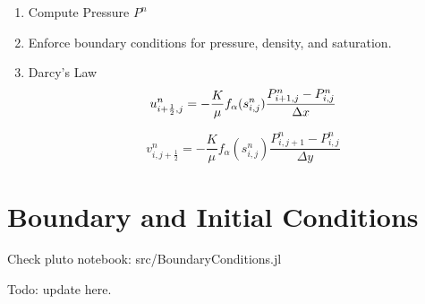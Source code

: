 \documentclass[a4paper,12pt]{article}
\begin{document}
\begin{enumerate}
\begin{enumerate}
            \item Compute Pressure \(P^n\)
            \item Enforce boundary conditions for pressure,
                density, and saturation.
            \item Darcy's Law
\[
    u_{i + \frac{1}{2}, j}^n = -\frac{K}{\mu} f_\alpha (s_{i, j}^n)
    \frac{P_{i + 1, j}^n - P_{i, j}^n}{\Delta x} \\
\] 

\[
    v_{i, j + \frac{1}{2}}^n = -\frac{K}{\mu} f_\alpha(s_{i, j}^n)
    \frac{P_{i, j + 1}^n - P_{i, j}^n}{\Delta y}
\] 
        \end{enumerate}
\end{enumerate}

\section{Boundary and Initial Conditions}
Check pluto notebook: src/BoundaryConditions.jl

Todo: update here.
\end{document}
